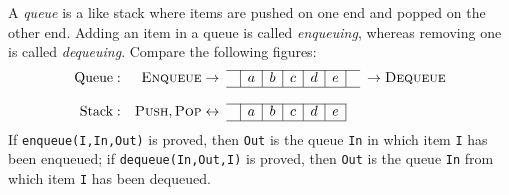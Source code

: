 \noindent A \emph{queue} is a like stack where items are pushed on one
end and popped on the other end. Adding an item in a queue is called
\emph{enqueuing}, whereas removing one is called
\emph{dequeuing}. Compare the following figures:
\[
\begin{array}{rr@{\;}cc|c|c|c|c|c|cc@{\;}l}
\cline{4-10}
\text{Queue}: & \textsc{Enqueue} & \rightarrow & & a & b & c & d & e &
& \rightarrow & \textsc{Dequeue}\\
\cline{4-10}\\
\cline{4-9}
\text{Stack}: & \textsc{Push}, \textsc{Pop} & \leftrightarrow & & a &
b & c & d & e &&&\\
\cline{4-9}
\end{array}
\]
\noindent If \texttt{enqueue(I,In,Out)} is proved, then \texttt{Out}
is the queue \texttt{In} in which item \texttt{I} has been enqueued;
if \texttt{dequeue(In,Out,I)} is proved, then \texttt{Out} is the
queue \texttt{In} from which item \texttt{I} has been dequeued.

